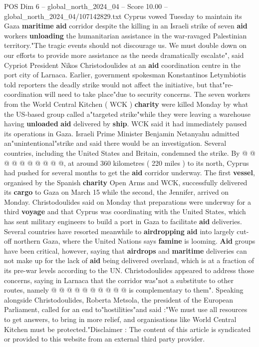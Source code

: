 \begin{textsample}{POS Dim 6 – global\_north\_2024\_04 – Score 10.00 – global\_north\_2024\_04/107142829.txt}  \label{ex:f6_pos_074}
Cyprus vowed Tuesday to maintain its Gaza \textbf{maritime} \textbf{aid} corridor despite the killing in an Israeli strike of seven \textbf{aid} workers \textbf{unloading} the humanitarian assistance in the war-ravaged Palestinian territory."The tragic events should not discourage us.
We must double down on our efforts to provide more assistance as the needs dramatically escalate", said Cypriot President Nikos Christodoulides at an \textbf{aid} coordination centre in the port city of Larnaca.
Earlier, government spokesman Konstantinos Letymbiotis told reporters the deadly strike would not affect the initiative, but that"re-coordination will need to take place"due to security concerns.
The seven workers from the World Central Kitchen ( WCK ) \textbf{charity} were killed Monday by what the US-based group called a"targeted strike"while they were leaving a warehouse having \textbf{unloaded} \textbf{aid} delivered by \textbf{ship}.
WCK said it had immediately paused its operations in Gaza.
Israeli Prime Minister Benjamin Netanyahu admitted an"unintentional"strike and said there would be an investigation.
Several countries, including the United States and Britain, condemned the strike.
By @ @ @ @ @ @ @ @ @ @, at around 360 kilometres ( 220 miles ) to its north, Cyprus had pushed for several months to get the \textbf{aid} corridor underway.
The first \textbf{vessel}, organised by the Spanish \textbf{charity} Open Arms and WCK, successfully delivered its \textbf{cargo} to Gaza on March 15 while the second, the Jennifer, arrived on Monday.
Christodoulides said on Monday that preparations were underway for a third \textbf{voyage} and that Cyprus was coordinating with the United States, which has sent military engineers to build a port in Gaza to facilitate \textbf{aid} deliveries.
Several countries have resorted meanwhile to \textbf{airdropping} \textbf{aid} into largely cut-off northern Gaza, where the United Nations says \textbf{famine} is looming. \textbf{Aid} groups have been critical, however, saying that \textbf{airdrops} and \textbf{maritime} deliveries can not make up for the lack of \textbf{aid} being delivered overland, which is at a fraction of its pre-war levels according to the UN.
Christodoulides appeared to address those concerns, saying in Larnaca that the corridor was"not a substitute to other routes, namely @ @ @ @ @ @ @ @ @ @ is complementary to them".
Speaking alongside Christodoulides, Roberta Metsola, the president of the European Parliament, called for an end to"hostilities"and said :"We must use all resources to get answers, to bring in more relief, and organisations like World Central Kitchen must be protected."Disclaimer : The content of this article is syndicated or provided to this website from an external third party provider.

\end{textsample}

